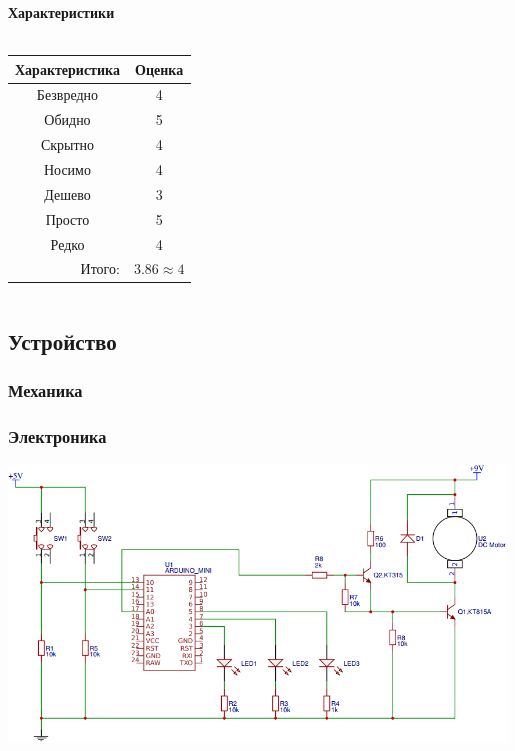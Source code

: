 \begin{frame}
    \frametitle{\myDevice}
    \framesubtitle{Характеристики}
    
    \begin{columns}
            \begin{center}
                \begin{tabular}{c|c}
                    \hline\hline
                    Характеристика              & Оценка\\ \hline\hline
                    Безвредно                   & 4 \\
                    Обидно                      & 5 \\
                    Скрытно                     & 4 \\
                    Носимо                      & 4 \\
                    Дешево                      & 3 \\
                    Просто                      & 5 \\ 
                    Редко                       & 4 \\ \hline
                    \multicolumn{1}{r|}{Итого:} & $3.86\approx 4$ \\
                \end{tabular}
            \end{center}
    \end{columns}    
\end{frame}


\subsection{Устройство}

\begin{frame}
    \frametitle{Механика \myDevice}
    
\end{frame}

\begin{frame}
    \frametitle{Электроника \myDevice}
    
    \begin{center}
        \includegraphics[width=0.99\textwidth]{fig/eScheme}
    \end{center}
\end{frame}

